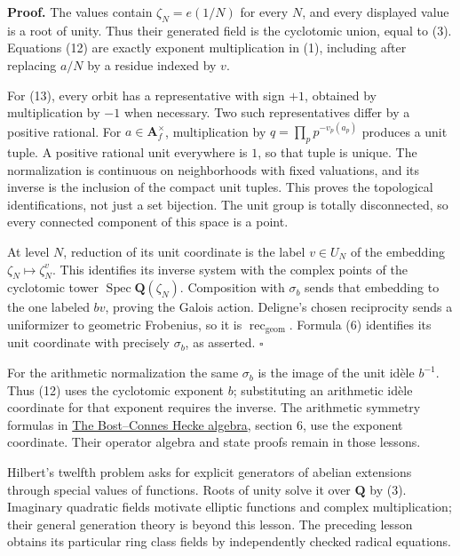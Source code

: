 \documentclass[11pt,a4paper]{article}
\begin{document}
\textbf{Proof.} The values contain \(\zeta_N=e(1/N)\) for every \(N\),
and every displayed value is a root of unity. Thus their generated field
is the cyclotomic union, equal to (3). Equations (12) are exactly
exponent multiplication in (1), including after replacing \(a/N\) by a
residue indexed by \(v\).

For (13), every orbit has a representative with sign \(+1\), obtained by
multiplication by \(-1\) when necessary. Two such representatives differ
by a positive rational. For \(a\in\mathbf A_f^\times\), multiplication
by \(q=\prod_p p^{-v_p(a_p)}\) produces a unit tuple. A positive
rational unit everywhere is \(1\), so that tuple is unique. The
normalization is continuous on neighborhoods with fixed valuations, and
its inverse is the inclusion of the compact unit tuples. This proves the
topological identifications, not just a set bijection. The unit group is
totally disconnected, so every connected component of this space is a
point.

At level \(N\), reduction of its unit coordinate is the label
\(v\in U_N\) of the embedding \(\zeta_N\mapsto\zeta_N^v\). This
identifies its inverse system with the complex points of the cyclotomic
tower \(\operatorname{Spec}\mathbf Q(\zeta_N)\). Composition with
\(\sigma_b\) sends that embedding to the one labeled \(bv\), proving the
Galois action. Deligne's chosen reciprocity sends a uniformizer to
geometric Frobenius, so it is \(\operatorname{rec}_{\mathrm{geom}}\).
Formula (6) identifies its unit coordinate with precisely \(\sigma_b\),
as asserted. \(\square\)

For the arithmetic normalization the same \(\sigma_b\) is the image of
the unit idèle \(b^{-1}\). Thus (12) uses the cyclotomic exponent \(b\);
substituting an arithmetic idèle coordinate for that exponent requires
the inverse. The arithmetic symmetry formulas in
\href{https://kokunoyumeto.github.io/open-math-courses/courses/NT-CFT/proof-dependencies.html\#QSM-L03}{The
Bost--Connes Hecke algebra}, section 6, use the exponent coordinate.
Their operator algebra and state proofs remain in those lessons.

Hilbert's twelfth problem asks for explicit generators of abelian
extensions through special values of functions. Roots of unity solve it
over \(\mathbf Q\) by (3). Imaginary quadratic fields motivate elliptic
functions and complex multiplication; their general generation theory is
beyond this lesson. The preceding lesson obtains its particular ring
class fields by independently checked radical equations.
\end{document}
